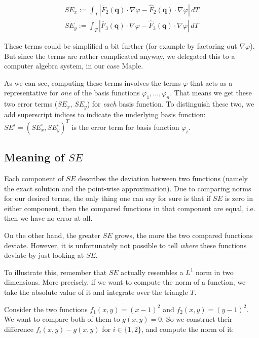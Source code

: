\documentclass{article}
\renewcommand{\phi}{\varphi}
\begin{document}
\begin{eqnarray*}
  SE_x := \int_T \left| \overline{F}_2(\mathbf{q}) \cdot \nabla \phi - \widehat{F}_2(\mathbf{q}) \cdot \nabla \phi \right| \, dT\\
  SE_y := \int_T \left| \overline{F}_3(\mathbf{q}) \cdot \nabla \phi - \widehat{F}_3(\mathbf{q}) \cdot \nabla \phi \right| \, dT
\end{eqnarray*}

These terms could be simplified a bit further (for example by factoring out $\nabla \phi$). But since the terms are rather complicated anyway, we delegated this to a computer algebra system, in our case Maple.

As we can see, computing these terms involves the terms $\phi$ that acts as a representative for \emph{one} of the basis functions $\phi_1,\dots,\phi_n$. That means we get these two error terms ($SE_x$, $SE_y$) for \emph{each} basis function. To distinguish these two, we add superscript indices to indicate the underlying basis function: $SE^i= \left(SE_x^i, SE_y^i\right)^T$ is the error term for basis function $\phi_i$.

\subsection{\texorpdfstring{Meaning of $SE$}{Meaning of SE}}
\label{sec:stiffness-analysis-what-does-se-mean}

Each component of $SE$ describes the deviation between two functions (namely the exact solution and the point-wise approximation). Due to comparing norms for our desired terms, the only thing one can say for sure is that if $SE$ is zero in either component, then the compared functions in that component are equal, i.e.\,then we have no error at all.

On the other hand, the greater $SE$ grows, the more the two compared functions deviate. However, it is unfortunately not possible to tell \emph{where} these functions deviate by just looking at $SE$.

To illustrate this, remember that $SE$ actually resembles a $L^1$ norm in two dimensions. More precisely, if we want to compute the norm of a function, we take the absolute value of it and integrate over the triangle $T$.

Consider the two functions $f_1(x,y)=(x-1)^2$ and $f_2(x,y)=(y-1)^2$. We want to compare both of them to $g(x,y)=0$. So we construct their difference $f_i(x,y)-g(x,y)$ for $i\in\{1,2\}$, and compute the norm of it:
\end{document}
